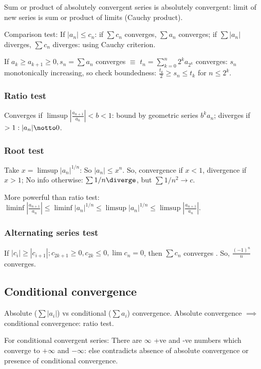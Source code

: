 \documentclass[oneside, article]{memoir}
\begin{document}
Sum or product of absolutely convergent series is absolutely convergent: limit of new series is sum or product of limits (Cauchy product).

Comparison test: If $|a_{n}| \leq c_{n}$: if $\sum c_{n}$ converges, $\sum a_{n}$ converges; if $\sum |a_{n}|$ diverges, $\sum c_{n}$ diverges: using Cauchy criterion.

If $a_{k} \geq a_{k+1}\geq 0, s_{n} = \sum a_{n}$ converges $\equiv$ $t_{n} = \sum_{k=0}^{n} 2^{k}a_{2^{k}}$ converges: $s_{n}$ monotonically increasing, so check boundedness: $\frac{t_{k}}{2}\geq s_{n}\leq t_{k}$ for $n\leq 2^{k}$.

\subsubsection{Ratio test}
Converges if $\limsup |\frac{a_{n+1}}{a_{n}}| < b< 1$: bound by geometric series $b^{k}a_{n}$; diverges if $>1: |a_{n}| \notto 0$.

\subsubsection{Root test}
Take $x = \limsup |a_{n}|^{1/n}$: So $|a_{n}| \leq x^{n}$. So, convergence if $x<1$, divergence if $x>1$; No info otherwise: $\sum 1/n \diverge$, but $\sum 1/n^{2} \to c$.

More powerful than ratio test: \\
$\liminf |\frac{a_{n+1}}{a_{n}}| \leq \liminf |a_{n}|^{1/n} \leq \limsup |a_{n}|^{1/n} \leq \limsup |\frac{a_{n+1}}{a_{n}}|$. \why

\subsubsection{Alternating series test}
If $|c_{i}| \geq |c_{i+1}|; c_{2k+1} \geq 0, c_{2k} \leq 0, \lim c_{n} = 0$, then $\sum c_{n}$ converges \why. So, $\frac{(-1)^{n}}{n}$ converges.

\subsection{Conditional convergence}
Absolute ($\sum |a_{i}|$) vs conditional ($\sum a_{i}$) convergence. Absolute convergence $\implies$ conditional convergence: ratio test.

For conditional convergent series: There are $\infty$ +ve and -ve numbers which converge to $+\infty$ and $-\infty$: else contradicts absence of absolute convergence or presence of conditional convergence.
\end{document}
